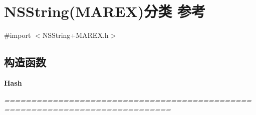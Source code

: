 \hypertarget{category_n_s_string_07_m_a_r_e_x_08}{}\section{N\+S\+String(M\+A\+R\+EX)分类 参考}
\label{category_n_s_string_07_m_a_r_e_x_08}


{\ttfamily \#import $<$N\+S\+String+\+M\+A\+R\+E\+X.\+h$>$}

\subsection*{构造函数}
\begin{Indent}\textbf{ Hash}\par
{\em ============================================================================= 

}
\end{Indent}
